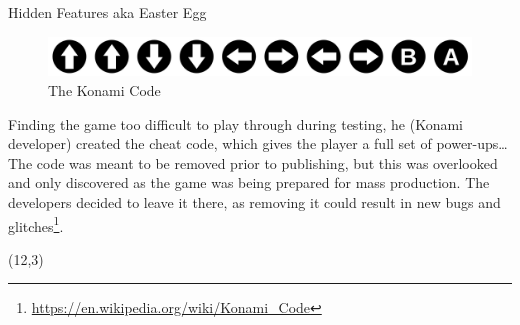 \documentclass{beamer}
\begin{document}
\begin{frame}[t]{Hidden Features aka Easter Egg}
    \begin{figure}
    \begin{center}
        \includegraphics[width=.5\textwidth]{images/1280px-Konami_Code.svg.png}
    \end{center}
    \caption{The Konami Code}
    \label{fig:konami}
    \end{figure}

    \pause
    Finding the game too difficult to play through during testing, he (Konami developer) created the cheat code, which gives the player a full set of power-ups\ldots The code was meant to be removed prior to publishing, but this was overlooked and only discovered as the game was being prepared for mass production. The developers decided to leave it there, as removing it could result in new bugs and glitches\footnote{\url{https://en.wikipedia.org/wiki/Konami_Code}}. 
    \begin{textblock}{3}(12,3)
    \end{textblock}
\end{frame}
\end{document}
